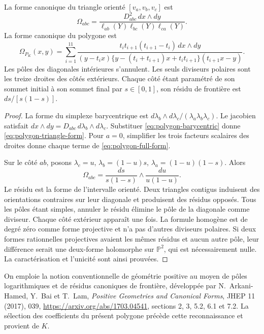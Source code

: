 \begin{theorem}
\label{thm:polygon-form}
La forme canonique du triangle orienté \([v_a,v_b,v_c]\) est
\begin{equation}
 \Omega_{abc}=
 \frac{D_{abc}^2\,dx\wedge dy}
 {\ell_{ab}(Y)\ell_{bc}(Y)\ell_{ca}(Y)}.
 \label{eq:polygon-triangle-form}
\end{equation}
La forme canonique du polygone est
\begin{equation}
 \boxed{\displaystyle
 \Omega_{P_K}(x,y)=
 \sum_{i=1}^{11}
 \frac{t_it_{i+1}(t_{i+1}-t_i)\,dx\wedge dy}
 {(y-t_ix)\{y-(t_i+t_{i+1})x+t_it_{i+1}\}(t_{i+1}x-y)}.}
 \label{eq:polygon-full-form}
\end{equation}
Les pôles des diagonales intérieures s’annulent. Les seuls diviseurs
polaires sont les treize droites des côtés extérieurs. Chaque côté étant paramétré
de son sommet initial à son sommet final par \(s\in[0,1]\), son résidu de
frontière est \(ds/[s(1-s)]\).
\end{theorem}
\begin{proof}
La forme du simplexe barycentrique est \(d\lambda_b\wedge d\lambda_c/(\lambda_a\lambda_b\lambda_c)\). Le jacobien satisfait \(dx\wedge dy=D_{abc}\,d\lambda_b\wedge d\lambda_c\). Substituer \eqref{eq:polygon-barycentric} donne \eqref{eq:polygon-triangle-form}. Pour \(a=0\), simplifier les trois facteurs scalaires des droites donne chaque terme de \eqref{eq:polygon-full-form}.

Sur le côté \(ab\), posons \(\lambda_c=u\),
\(\lambda_b=(1-u)s\), \(\lambda_a=(1-u)(1-s)\). Alors
\[
 \Omega_{abc}=\frac{ds}{s(1-s)}\wedge\frac{du}{u(1-u)}.
\]
Le résidu est la forme de l’intervalle orienté. Deux triangles contigus
induisent des orientations contraires sur leur diagonale et produisent des résidus
opposés. Tous les pôles étant simples, annuler le résidu élimine le
pôle de la diagonale comme diviseur. Chaque côté extérieur apparaît une fois.
La formule homogène est de degré zéro comme forme projective et n’a pas
d’autres diviseurs polaires. Si deux formes rationnelles projectives avaient les
mêmes résidus et aucun autre pôle, leur différence serait une deux-forme
holomorphe sur \(\mathbb P^2\), qui est nécessairement nulle. La
caractérisation et l’unicité sont ainsi prouvées.
\end{proof}

On emploie la notion conventionnelle de géométrie positive au moyen de pôles logarithmiques et de résidus canoniques de frontière, développée par N.~Arkani-Hamed, Y.~Bai et T.~Lam, \emph{Positive Geometries and Canonical Forms}, JHEP 11 (2017), 039, \url{https://arxiv.org/abs/1703.04541}, sections 2, 3, 5.2, 6.1 et 7.2. La sélection des coefficients du présent polygone précède cette reconnaissance et provient de \(K\).

